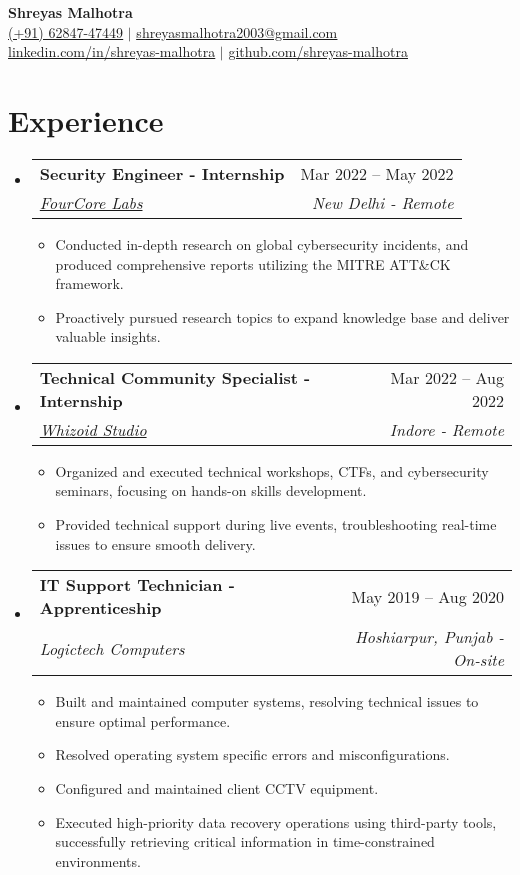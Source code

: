 \documentclass[letterpaper,12pt]{article}
\newcommand{\resumeItem}[1]{
  \item[--]\small{#1} %
}
\newcommand{\resumeSubheading}[4]{
  \item \vspace{1pt}
    \begin{tabularx}{\textwidth}{Xr}
      \textbf{#1} & #2 \\
      \textit{\small#3} & \textit{\small #4} \\
    \end{tabularx} \vspace{1pt}
}
\newcommand{\resumeItemListStart}{\begin{itemize}[topsep=1pt, itemsep=1pt, leftmargin=0.2in]}
\newcommand{\resumeItemListEnd}{\end{itemize} \vspace{1pt}}
\newcommand{\resumeSubHeadingListStart}{\begin{itemize}[leftmargin=0.15in, label={}, topsep=2pt]}
\newcommand{\resumeSubHeadingListEnd}{\end{itemize}}
\begin{document}

\begin{center}
    \textbf{\Huge Shreyas Malhotra} \\ \vspace{4pt}
    \small \href{tel:+916284747449}{\underline{(+91) 62847-47449}} $|$ \small \href{mailto:shreyasmalhotra2003@gmail.com}{\underline{shreyasmalhotra2003@gmail.com}} \\
    \small \href{https://linkedin.com/in/shreyas-malhotra}{\underline{linkedin.com/in/shreyas-malhotra}} $|$
    \small \href{https://github.com/shreyas-malhotra}{\underline{github.com/shreyas-malhotra}}
\end{center}


\section{Experience}
  \resumeSubHeadingListStart
    \resumeSubheading
      {Security Engineer - Internship}{Mar 2022 -- May 2022}
      {\href{https://fourcore.io}{FourCore Labs}}{New Delhi - Remote}
      \resumeItemListStart
        \resumeItem{Conducted in-depth research on global cybersecurity incidents, and produced comprehensive reports utilizing the MITRE ATT\&CK framework.}
        \resumeItem{Proactively pursued research topics to expand knowledge base and deliver valuable insights.}
      \resumeItemListEnd

    \resumeSubheading
      {Technical Community Specialist - Internship}{Mar 2022 -- Aug 2022}
      {\href{https://whizoid.com}{Whizoid Studio}}{Indore - Remote}
      \resumeItemListStart
        \resumeItem{Organized and executed technical workshops, CTFs, and cybersecurity seminars, focusing on hands-on skills development.}
        \resumeItem{Provided technical support during live events, troubleshooting real-time issues to ensure smooth delivery.}
      \resumeItemListEnd

    \resumeSubheading
      {IT Support Technician - Apprenticeship}{May 2019 -- Aug 2020}
      {Logictech Computers}{Hoshiarpur, Punjab - On-site}
      \resumeItemListStart
        \resumeItem{Built and maintained computer systems, resolving technical issues to ensure optimal performance.}
        \resumeItem{Resolved operating system specific errors and misconfigurations.}
        \resumeItem{Configured and maintained client CCTV equipment.}
        \resumeItem{Executed high-priority data recovery operations using third-party tools, successfully retrieving critical information in time-constrained environments.}
      \resumeItemListEnd
  \resumeSubHeadingListEnd
\end{document}
